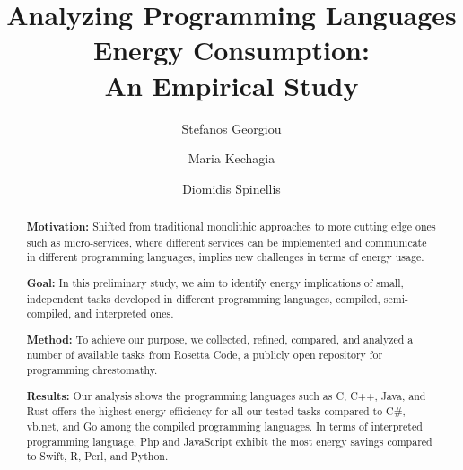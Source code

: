 \documentclass[sigconf]{acmart}
\begin{document}
\title{Analyzing Programming Languages Energy Consumption: \\ An Empirical Study}


\author{Stefanos Georgiou}

\author{Maria Kechagia}

\author{Diomidis Spinellis}


\renewcommand{\shortauthors}{S. Georgiou et al.}


\begin{abstract}
\noindent \textbf{Motivation:} Shifted from traditional 
monolithic approaches to more cutting edge ones such as micro-services, 
where different services can be implemented and communicate in 
different programming languages, implies new challenges in terms 
of energy usage.

\noindent \textbf{Goal:} In this preliminary study, we aim to 
identify energy implications of small, independent tasks developed 
in different programming languages, compiled, semi-compiled, and 
interpreted ones.

\noindent \textbf{Method:} To achieve our purpose, we collected, 
refined, compared, and analyzed a number of available tasks from Rosetta 
Code, a publicly open repository for programming chrestomathy. 

\noindent \textbf{Results:} Our analysis shows the programming 
languages such as C, C++, Java, and Rust offers the highest 
energy efficiency for all our tested tasks compared to C\#, 
{\sc vb.net}, and Go among the compiled programming languages. 
In terms of interpreted programming language, Php and JavaScript 
exhibit the most energy savings compared to Swift, R, Perl, and 
Python. 


\end{abstract}
\end{document}
